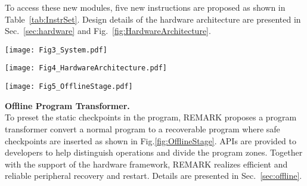 To access these new modules, five new instructions are proposed as shown in Table~\ref{tab:InstrSet}.
Design details of the hardware architecture are presented in Sec.~\ref{sec:hardware} and Fig.~\ref{fig:HardwareArchitecture}.


\begin{figure*}[!htbp]
    \centering
    \texttt{[image: Fig3\_System.pdf]}
    \caption{The HW/SW co-designed system diagram of REMARK.}
    \label{fig:SystemArchitecture}
\end{figure*}

%
\begin{figure*}[!htpb]
    \centering
    \texttt{[image: Fig4\_HardwareArchitecture.pdf]}
    \caption{The hardware architecture of REMARK and its main modules. }
    \label{fig:HardwareArchitecture}
\end{figure*}

\begin{figure*}[!htbp]
    \centering
    \texttt{[image: Fig5\_OfflineStage.pdf]}
    \caption{The program pre-processes during the software transformation stage.}
    \label{fig:OfflineStage}
\end{figure*}


\noindent\textbf{Offline Program Transformer.} \\
%
To preset the static checkpoints in the program, REMARK proposes a program transformer convert a normal program to a recoverable program where safe checkpoints are inserted as shown in Fig.\ref{fig:OfflineStage}.
APIs are provided to developers to help distinguish operations and divide the program zones.
Together with the support of the hardware framework, REMARK realizes efficient and reliable peripheral recovery and restart.
Details are presented in Sec.~\ref{sec:offline}.


\begin{comment}
\noindent\textbf{Online Recover Procedure.} \\
With the support of hardware architecture and the offline program transformer, an online recover procedure is proposed containing two parts, peripheral configuration and restart.
Based on PSRs, REMARK adopts an `init-used' strategy which only initializes and configures the invoked peripherals to avoid redundant reconfiguration overheads.
A config function queue (CFQ) is used to track and stores the peripheral configuration information.
The peripheral restart is realized by Initiator where peripheral checkpoints are stored.
Initiator is supported by the bootstrap in B/R Manager to control the system restart work flow.
After power failure, Initiator restarts all the checkpointed peripherals instantly and individually.
Considering the interactions of devices, the reliability of the entire recover procedure is guaranteed by the flexible B/R functions.
Details are explained in Sec.~\ref{sec:online}.
\end{comment}



